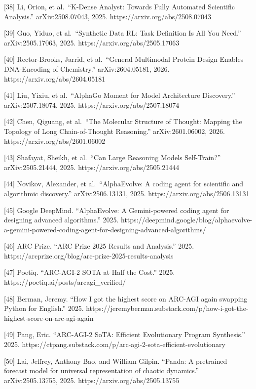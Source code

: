 {[}38{]} Li, Orion, et al.~``K-Dense Analyst: Towards Fully Automated
Scientific Analysis.'' arXiv:2508.07043, 2025.
https://arxiv.org/abs/2508.07043

{[}39{]} Guo, Yiduo, et al.~``Synthetic Data RL: Task Definition Is All
You Need.'' arXiv:2505.17063, 2025. https://arxiv.org/abs/2505.17063

{[}40{]} Rector-Brooks, Jarrid, et al.~``General Multimodal Protein
Design Enables DNA-Encoding of Chemistry.'' arXiv:2604.05181, 2026.
https://arxiv.org/abs/2604.05181

{[}41{]} Liu, Yixiu, et al.~``AlphaGo Moment for Model Architecture
Discovery.'' arXiv:2507.18074, 2025. https://arxiv.org/abs/2507.18074

{[}42{]} Chen, Qiguang, et al.~``The Molecular Structure of Thought:
Mapping the Topology of Long Chain-of-Thought Reasoning.''
arXiv:2601.06002, 2026. https://arxiv.org/abs/2601.06002

{[}43{]} Shafayat, Sheikh, et al.~``Can Large Reasoning Models
Self-Train?'' arXiv:2505.21444, 2025. https://arxiv.org/abs/2505.21444

{[}44{]} Novikov, Alexander, et al.~``AlphaEvolve: A coding agent for
scientific and algorithmic discovery.'' arXiv:2506.13131, 2025.
https://arxiv.org/abs/2506.13131

{[}45{]} Google DeepMind. ``AlphaEvolve: A Gemini-powered coding agent
for designing advanced algorithms.'' 2025.
https://deepmind.google/blog/alphaevolve-a-gemini-powered-coding-agent-for-designing-advanced-algorithms/

{[}46{]} ARC Prize. ``ARC Prize 2025 Results and Analysis.'' 2025.
https://arcprize.org/blog/arc-prize-2025-results-analysis

{[}47{]} Poetiq. ``ARC-AGI-2 SOTA at Half the Cost.'' 2025.
https://poetiq.ai/posts/arcagi\_verified/

{[}48{]} Berman, Jeremy. ``How I got the highest score on ARC-AGI again
swapping Python for English.'' 2025.
https://jeremyberman.substack.com/p/how-i-got-the-highest-score-on-arc-agi-again

{[}49{]} Pang, Eric. ``ARC-AGI-2 SoTA: Efficient Evolutionary Program
Synthesis.'' 2025.
https://ctpang.substack.com/p/arc-agi-2-sota-efficient-evolutionary

{[}50{]} Lai, Jeffrey, Anthony Bao, and William Gilpin. ``Panda: A
pretrained forecast model for universal representation of chaotic
dynamics.'' arXiv:2505.13755, 2025. https://arxiv.org/abs/2505.13755

